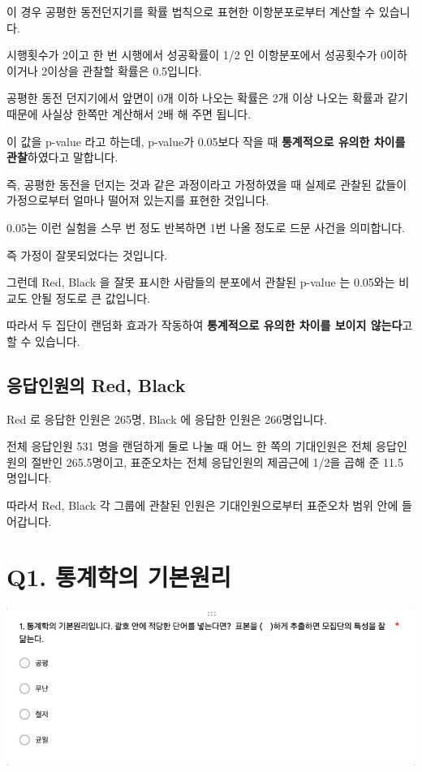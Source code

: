 \documentclass[
]{book}
\begin{document}
이 경우 공평한 동전던지기를 확률 법칙으로 표현한 이항분포로부터 계산할 수 있습니다.

시행횟수가 2이고 한 번 시행에서 성공확률이 1/2 인 이항분포에서 성공횟수가 0이하이거나 2이상을 관찰할 확률은 0.5입니다.

공평한 동전 던지기에서 앞면이 0개 이하 나오는 확률은 2개 이상 나오는 확률과 같기 때문에 사실상 한쪽만 계산해서 2배 해 주면 됩니다.

이 값을 p-value 라고 하는데, p-value가 0.05보다 작을 때 \textbf{통계적으로 유의한 차이를 관찰}하였다고 말합니다.

즉, 공평한 동전을 던지는 것과 같은 과정이라고 가정하였을 때 실제로 관찰된 값들이 가정으로부터 얼마나 떨어져 있는지를 표현한 것입니다.

0.05는 이런 실험을 스무 번 정도 반복하면 1번 나올 정도로 드문 사건을 의미합니다.

즉 가정이 잘못되었다는 것입니다.

그런데 Red, Black 을 잘못 표시한 사람들의 분포에서 관찰된 p-value 는 0.05와는 비교도 안될 정도로 큰 값입니다.

따라서 두 집단이 랜덤화 효과가 작동하여 \textbf{통계적으로 유의한 차이를 보이지 않는다}고 할 수 있습니다.

\subsection{응답인원의 Red, Black}\label{uxc751uxb2f5uxc778uxc6d0uxc758-red-black-6}

Red 로 응답한 인원은 265명, Black 에 응답한 인원은 266명입니다.

전체 응답인원 531 명을 랜덤하게 둘로 나눌 때 어느 한 쪽의 기대인원은 전체 응답인원의 절반인 265.5명이고, 표준오차는 전체 응답인원의 제곱근에 1/2을 곱해 준 11.5 명입니다.

따라서 Red, Black 각 그룹에 관찰된 인원은 기대인원으로부터 표준오차 범위 안에 들어갑니다.

\section{Q1. 통계학의 기본원리}\label{q1.-uxd1b5uxacc4uxd559uxc758-uxae30uxbcf8uxc6d0uxb9ac}

\begin{flushleft}\includegraphics[width=0.75\linewidth]{./pics/Quiz210406_Q1} \end{flushleft}
\end{document}
